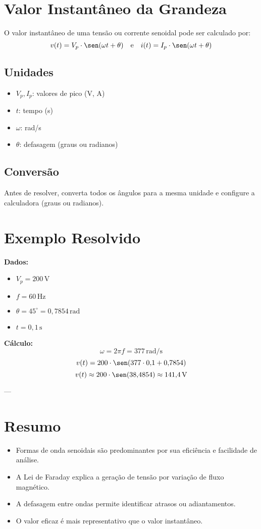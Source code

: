 \section{Valor Instantâneo da Grandeza}

O valor instantâneo de uma tensão ou corrente senoidal pode ser calculado por:
\[
v(t) = V_p \cdot \sen(\omega t + \theta)
\quad\text{e}\quad
i(t) = I_p \cdot \sen(\omega t + \theta)
\]

\subsection{Unidades}
\begin{itemize}
  \item \(V_p, I_p\): valores de pico (V, A)
  \item \(t\): tempo (s)
  \item \(\omega\): rad/s
  \item \(\theta\): defasagem (graus ou radianos)
\end{itemize}

\subsection{Conversão}
Antes de resolver, converta todos os ângulos para a mesma unidade e configure a calculadora (graus ou radianos).

\section{Exemplo Resolvido}

\textbf{Dados:}
\begin{itemize}
  \item \(V_p = 200\,\text{V}\)
  \item \(f = 60\,\text{Hz}\)
  \item \(\theta = 45^\circ = 0{,}7854\,\text{rad}\)
  \item \(t = 0{,}1\,\text{s}\)
\end{itemize}

\textbf{Cálculo:}
\[
\omega = 2\pi f = 377\,\text{rad/s}
\]
\[
v(t) = 200 \cdot \sen(377 \cdot 0{,}1 + 0{,}7854)
\]
\[
v(t) \approx 200 \cdot \sen(38{,}4854) \approx 141{,}4\,\text{V}
\]

---

\section{Resumo}
\begin{itemize}
  \item Formas de onda senoidais são predominantes por sua eficiência e facilidade de análise.
  \item A Lei de Faraday explica a geração de tensão por variação de fluxo magnético.
  \item A defasagem entre ondas permite identificar atrasos ou adiantamentos.
  \item O valor eficaz é mais representativo que o valor instantâneo.
\end{itemize}

